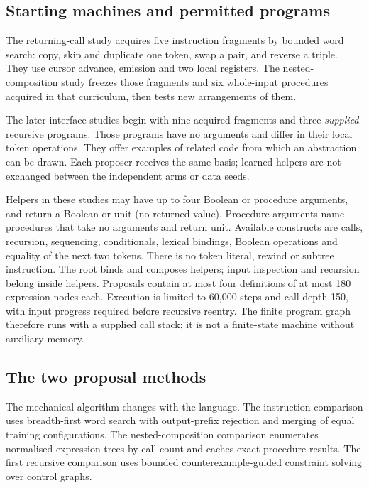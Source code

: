 \subsection{Starting machines and permitted programs}

The returning-call study acquires five instruction fragments by bounded word
search: copy, skip and duplicate one token, swap a pair, and reverse a triple.
They use cursor advance, emission and two local registers. The nested-composition
study freezes those fragments and six whole-input procedures acquired in that
curriculum, then tests new arrangements of them.

The later interface studies begin with nine acquired fragments and three
\emph{supplied} recursive programs. Those programs have no arguments and differ
in their local token operations. They offer examples of related code from which
an abstraction can be drawn. Each proposer receives the same basis; learned
helpers are not exchanged between the independent arms or data seeds.

Helpers in these studies may have up to four Boolean or procedure arguments,
and return a Boolean or unit (no returned value). Procedure arguments name
procedures that take no arguments and return unit. Available constructs are
calls, recursion, sequencing,
conditionals, lexical bindings, Boolean operations and equality of the next
two tokens. There is no token literal, rewind or subtree instruction.
The root binds and composes helpers; input inspection and recursion belong
inside helpers. Proposals contain at most four definitions of at most 180
expression nodes each. Execution is limited to 60,000 steps and call depth 150,
with input progress required before recursive reentry. The finite program graph
therefore runs with a supplied call stack; it is not a finite-state machine
without auxiliary memory.

\subsection{The two proposal methods}

The mechanical algorithm changes with the language. The instruction comparison
uses breadth-first word search with output-prefix rejection and merging of
equal training configurations. The nested-composition comparison enumerates
normalised expression trees by call count and caches exact procedure results.
The first recursive comparison uses bounded counterexample-guided constraint
solving over control graphs.


